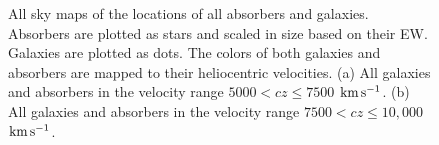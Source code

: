 \documentclass[twocolumn,tighten]{aastex62}
\newcommand{\kms}{$\rm km\, s^{-1}$}
\begin{document}
\begin{figure}[ht!]
\centering
  \label{allsky_7500}
  \label{allsky_10000}
  \caption{\small{All sky maps of the locations of all absorbers and galaxies. Absorbers are plotted as stars and scaled in size based on their EW. Galaxies are plotted as dots. The colors of both galaxies and absorbers are mapped to their heliocentric velocities. (a) All galaxies and absorbers in the velocity range $5000 < cz \leq 7500$ \kms. (b) All galaxies and absorbers in the velocity range $7500 < cz \leq 10,000$ \kms.}}
\vspace{0pt}
\label{allsky_7500-10000}
\end{figure}
\end{document}
